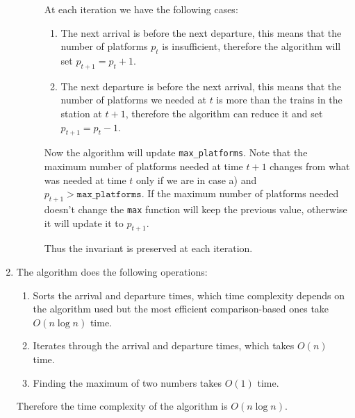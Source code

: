 \documentclass[10pt]{article}
\begin{document}
\begin{enumerate}
\begin{description}
                    At each iteration we have the following cases:
                    \begin{enumerate}[label=\alph*)]
                        \item The next arrival is before the next departure, this means that the number of platforms $p_t$ is insufficient, therefore the algorithm will set $p_{t + 1} = p_t + 1$.
                        \item The next departure is before the next arrival, this means that the number of platforms we needed at $t$ is more than the trains in the station at $t+1$, therefore the algorithm can reduce it and set $p_{t + 1} = p_t - 1$.
                    \end{enumerate}

                    Now the algorithm will update \texttt{max\_platforms}.
                    Note that the maximum number of platforms needed at time $t + 1$ changes from what was needed at time $t$ only if we are in case a) and $p_{t + 1} > \texttt{max\_platforms}$. If the maximum number of platforms needed doesn't change the \texttt{max} function will keep the previous value, otherwise it will update it to $p_{t + 1}$.

                    Thus the invariant is preserved at each iteration.
          \end{description}

    \item The algorithm does the following operations:
          \begin{enumerate}[label=\alph*)]
              \item Sorts the arrival and departure times, which time complexity depends on the algorithm used but the most efficient comparison-based ones take $O(n \log n)$ time.
              \item Iterates through the arrival and departure times, which takes $O(n)$ time.
              \item Finding the maximum of two numbers takes $O(1)$ time.
          \end{enumerate}
          Therefore the time complexity of the algorithm is $O(n \log n)$.
\end{enumerate}
\end{document}
